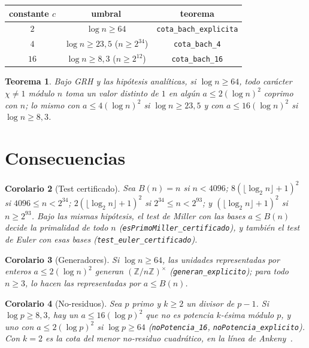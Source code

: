 \documentclass[11pt,a4paper]{amsart}
\newtheorem{teorema}{Teorema}
\newtheorem{corolario}[teorema]{Corolario}
\theoremstyle{remark}
\newcommand{\Z}{\mathbb{Z}}
\begin{document}
\begin{center}
\begin{tabular}{ccc}
\toprule
constante $c$ & umbral & teorema \\
\midrule
$2$ & $\log n\ge64$ & \texttt{cota\_bach\_explicita}\\
$4$ & $\log n\ge23{,}5$ ($n\ge2^{34}$) & \texttt{cota\_bach\_4}\\
$16$ & $\log n\ge8{,}3$ ($n\ge2^{12}$) & \texttt{cota\_bach\_16}\\
\bottomrule
\end{tabular}
\end{center}

\begin{teorema}
Bajo GRH y las hip\'otesis anal\'iticas, si $\log n\ge64$, todo car\'acter $\chi\ne1$ m\'odulo $n$ toma un valor distinto de $1$ en alg\'un $a\le2(\log n)^2$ coprimo con $n$; lo mismo con $a\le4(\log n)^2$ si $\log n\ge23{,}5$ y con $a\le16(\log n)^2$ si $\log n\ge8{,}3$.
\end{teorema}

\section{Consecuencias}

\begin{corolario}[Test certificado]
Sea $B(n)=n$ si $n<4096$; $8(\lfloor\log_2n\rfloor+1)^2$ si $4096\le n<2^{34}$; $2(\lfloor\log_2n\rfloor+1)^2$ si $2^{34}\le n<2^{93}$; y $(\lfloor\log_2n\rfloor+1)^2$ si $n\ge2^{93}$. Bajo las mismas hip\'otesis, el test de Miller con las bases $a\le B(n)$ decide la primalidad de todo $n$ (\texttt{esPrimoMiller\_\allowbreak certificado}), y tambi\'en el test de Euler con esas bases (\texttt{test\_euler\_\allowbreak certificado}).
\end{corolario}

\begin{corolario}[Generadores]
Si $\log n\ge64$, las unidades representadas por enteros $a\le2(\log n)^2$ generan $(\Z/n\Z)^\times$ (\texttt{generan\_explicito}); para todo $n\ge3$, lo hacen las representadas por $a\le B(n)$.
\end{corolario}

\begin{corolario}[No-residuos]
Sea $p$ primo y $k\ge2$ un divisor de $p-1$. Si $\log p\ge8{,}3$, hay un $a\le16(\log p)^2$ que no es potencia $k$-\'esima m\'odulo $p$, y uno con $a\le2(\log p)^2$ si $\log p\ge64$ (\texttt{noPotencia\_16}, \texttt{noPotencia\_explicito}). Con $k=2$ es la cota del menor no-residuo cuadr\'atico, en la l\'inea de Ankeny~\cite{Ankeny}.
\end{corolario}
\end{document}
